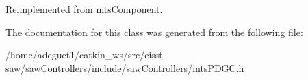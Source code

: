 Reimplemented from \hyperlink{classmts_component_aaf28f0262b44eb6866e10089a02fa6e4}{mts\-Component}.



The documentation for this class was generated from the following file\-:\begin{DoxyCompactItemize}
\item 
/home/adeguet1/catkin\-\_\-ws/src/cisst-\/saw/saw\-Controllers/include/saw\-Controllers/\hyperlink{mts_p_d_g_c_8h}{mts\-P\-D\-G\-C.\-h}\end{DoxyCompactItemize}
